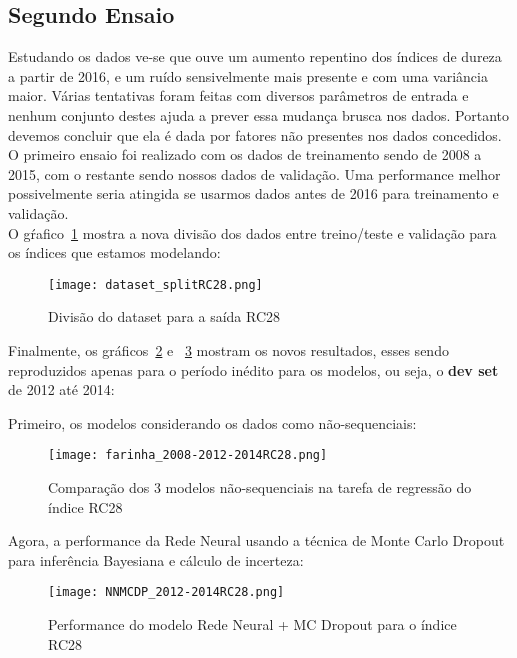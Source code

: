 \subsection{Segundo Ensaio}

Estudando os dados ve-se que ouve um aumento repentino dos índices de dureza a
partir de 2016, e um ruído sensivelmente mais presente e com uma variância
maior. Várias tentativas foram feitas com diversos parâmetros de entrada e
nenhum conjunto destes ajuda a prever essa mudança brusca nos dados. Portanto
devemos concluir que ela é dada por fatores não presentes nos dados concedidos.
O primeiro ensaio foi realizado com os dados de treinamento sendo de 2008 a
2015, com o restante sendo nossos dados de validação. Uma performance melhor
possivelmente seria atingida se usarmos dados antes de 2016 para treinamento e
validação. \\  


O gŕafico~\ref{fig:divrc28} mostra a nova divisão dos dados entre treino/teste e validação para os índices que estamos modelando:



\begin{figure}[H]
  \centering
\texttt{[image: dataset\_splitRC28.png]}
\caption{Divisão do dataset para a saída RC28}
  \label{fig:divrc28}
\end{figure}


Finalmente, os gráficos~\ref{fig:3nseq} e ~\ref{fig:nnmc2} mostram os novos resultados, esses sendo reproduzidos apenas para o período inédito para os modelos, ou seja, o \textbf{dev set} de 2012 até 2014:

Primeiro, os modelos considerando os dados como não-sequenciais:

\begin{figure}[H]
\centering
\texttt{[image: farinha\_2008-2012-2014RC28.png]}
\caption{Comparação dos 3 modelos não-sequenciais na tarefa de regressão do índice RC28}
\label{fig:3nseq}
\end{figure}


Agora, a performance da Rede Neural usando a técnica de Monte Carlo Dropout para inferência Bayesiana e cálculo de incerteza:


\begin{figure}[H]
\centering
\texttt{[image: NNMCDP\_2012-2014RC28.png]}
\caption{Performance do modelo Rede Neural + MC Dropout para o índice RC28}
\label{fig:nnmc2}
\end{figure}


